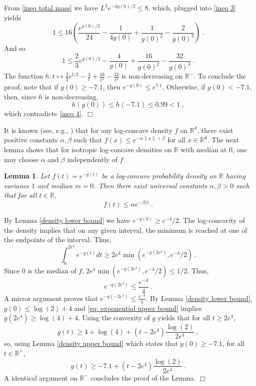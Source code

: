 \documentclass[12pt]{article}
\newcommand{\R}{\mathbb{R}}
\newtheorem{lemma}[theorem]{Lemma}
\newcommand{\qed}{\hfill $\Box$}
\newenvironment{proof}{\par\noindent{\bf Proof:}}{\qed \par\medskip\noindent}
\begin{document}
\begin{proof}
From \eqref{ineq total mass} we have $L^3e^{-3g(0)/2}\leq 8$, which, plugged into \eqref{ineq 3} yields
\begin{equation*}
1 \leq 16 \left(\frac{e^{g(0)/2}}{24} - \frac{1}{4g(0)}+\frac{1}{g(0)^2}-\frac{2}{g(0)^3}\right)~.
\end{equation*}
And so
\begin{equation}\label{ineq 4}
1\leq \frac{2}{3}e^{g(0)/2} - \frac{4}{g(0)}+\frac{16}{g(0)^2}-\frac{32}{g(0)^3}~.
\end{equation}
The function $h: t\mapsto
\frac{2}{3}e^{t/2} - \frac{4}{t}+\frac{16}{t^2}-\frac{32}{t^3}$ is
non-decreasing on $\R^-$. To conclude the proof, note that
if $g(0) \geq -7.1$, then $e^{-g(0)}\leq e^{7.1}$. Otherwise,
if $g(0)< -7.1$, then, since $h$ is non-decreasing, 
$$h(g(0))\leq h(-7.1)\leq0.99<1~,$$
which contradicts \eqref{ineq 4}.
\end{proof}


It is known (see, e.g., \cite{10.1214/09-EJS505}) that for any
log-concave density $f$ on $\R^d$, there exist positive constants
$\alpha,\beta$ such that $f(x)\leq e^{-\alpha \|x\|+\beta}$ for all
$x\in \R^d$. The next lemma shows that for isotropic log-concave densities on
$\R$ with
median at $0$, one may choose $\alpha$ and $\beta$ independently of $f$.


\begin{lemma}
\label{exponentialupperbound}
Let $f(t) = e^{-g(t)}$ be a log-concave probability density on $\R$
having variance $1$ and median $m=0$.
Then there exist universal constants $\alpha,\beta>0$ such that
for all $t \in \R$,
\[
  f(t) \leq \alpha e^{-\beta|t|}~.
\]
\end{lemma}

\begin{proof}
By Lemma \ref{density lower bound} we have $e^{-g(0)}\geq e^{-4}/2$. The log-concavity of the density implies that on any given interval, the minimum is reached at one of the endpoints of the interval. Thus,
$$ \int_0^{2e^4}e^{-g(t)}dt \geq 2e^4  \min\left(e^{-g(2e^4)},e^{-4}/2\right)~. $$
Since $0$ is the median of $f$, $2e^4 \min(e^{-g(2e^4)},e^{-4}/2)\leq 1/2$. Thus,
\begin{equation}\label{eq: exponential upper bound}
e^{-g(2e^4)} \leq \frac{e^{-4}}{4}~.
\end{equation}
A mirror argument proves that $ e^{-g(-2e^4)} \leq \frac{e^{-4}}{4}$.
By Lemma \ref{density lower bound}, $g(0)\leq \log(2)+4$ and
\eqref{eq: exponential upper bound} implies $g(2e^4)\geq
\log(4)+4$. Using the convexity of $g$ yields that for all $t \geq
2e^4$,
\[ g(t)\geq 4+\log(4)+(t-2e^4) \frac{\log(2)}{2e^4}~,
\]
so, using Lemma \ref{density upper bound} which states that $g(0)\geq -7.1$,
for all $t\in \R^+$,
\[  g(t)\geq  -7.1+(t-2e^4) \frac{\log(2)}{2e^4}  ~.
\]
A identical argument on $\R^-$ concludes the proof of the Lemma.
\end{proof}
\end{document}
